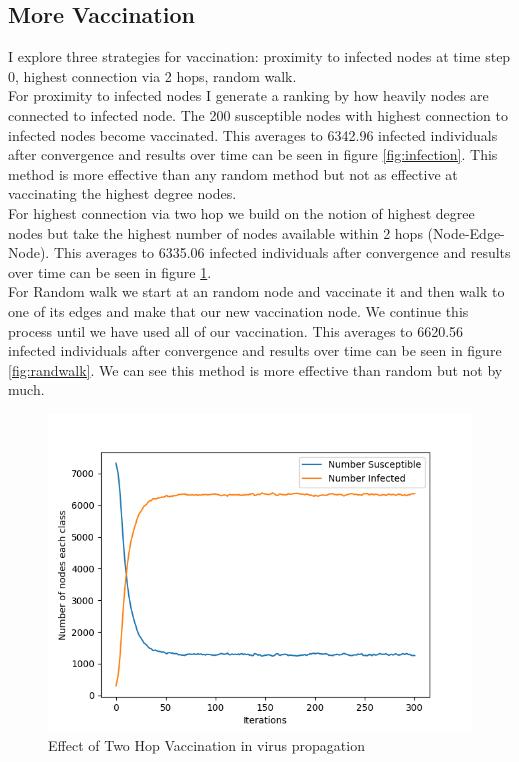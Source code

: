 \documentclass[11pt]{article}
\begin{document}
\subsection{More Vaccination}
I explore three strategies for vaccination: proximity to infected nodes at time step 0, highest connection via 2 hops, random walk. \\
For proximity to infected nodes I generate a ranking by how heavily nodes are connected to infected node. The 200 susceptible nodes with highest connection to infected nodes become vaccinated. This averages to 6342.96 infected individuals after convergence and results over time can be seen in figure \ref{fig:infection}. This method is more effective than any random method but not as effective at vaccinating the highest degree nodes. \\
For highest connection via two hop we build on the notion of highest degree nodes but take the highest number of nodes available within 2 hops (Node-Edge-Node). This averages to 6335.06 infected individuals after convergence and results over time can be seen in figure \ref{fig:2hop}. \\
For Random walk we start at an random node and vaccinate it and then walk to one of its edges and make that our new vaccination node. We continue this process until we have used all of our vaccination. This averages to 6620.56 infected individuals after convergence and results over time can be seen in figure \ref{fig:randwalk}. We can see this method is more effective than random but not by much.
\begin{figure}
    \centering
    \includegraphics{Assignments/Assignment2/two_hop.png}
    \caption{Effect of Two Hop Vaccination in virus propagation}
    \label{fig:2hop}
\end{figure}
\end{document}
